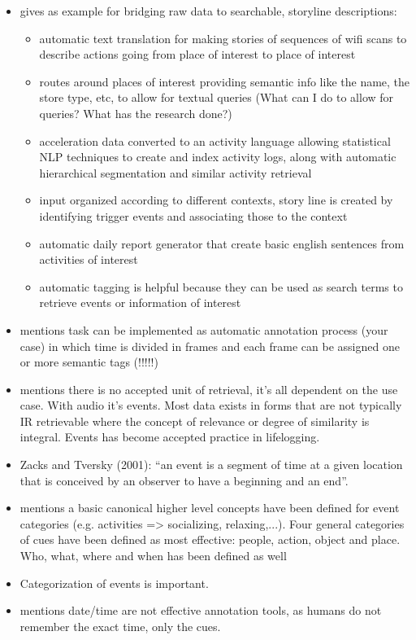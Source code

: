 \begin{itemize}
	\item \cite{bayindir2017survey} gives as example for bridging raw data to searchable, storyline descriptions:
	\begin{itemize}
		\item automatic text translation for making stories of sequences of wifi scans to describe actions going from place of interest to place of interest
		\item routes around places of interest providing semantic info like the name, the store type, etc, to allow for textual queries (What can I do to allow for queries? What has the research done?)
		\item acceleration data converted to an activity language allowing statistical NLP techniques to create and index activity logs, along with automatic hierarchical segmentation and similar activity retrieval
		\item input organized according to different contexts, story line is created by identifying trigger events and associating those to the context
		\item automatic daily report generator that create basic english sentences from activities of interest
		\item automatic tagging is helpful because they can be used as search terms to retrieve events or information of interest
	\end{itemize}
	
	\item \cite{bayindir2017survey} mentions task can be implemented as automatic annotation process (your case) in which time is divided in frames and each frame can be assigned one or more semantic tags (!!!!!)
	\item \cite{gurrin2014lifelogging} mentions there is no accepted unit of retrieval, it's all dependent on the use case. With audio it's events. Most data exists in forms that are not typically IR retrievable where the concept of relevance or degree of similarity is integral. Events has become accepted practice in lifelogging.
	\item Zacks and Tversky (2001): “an event is a segment of time at a given location that is conceived by
	an observer to have a beginning and an end”.
	\item \cite{gurrin2014lifelogging} mentions a basic canonical higher level concepts have been defined for event categories (e.g. activities => socializing, relaxing,...). Four general categories of cues have been defined as most effective: people, action, object and place. Who, what, where and when has been defined as well
	\item Categorization of events is important.
	\item \cite{gurrin2014lifelogging} mentions date/time are not effective annotation tools, as humans do not remember the exact time, only the cues.
\end{itemize}


